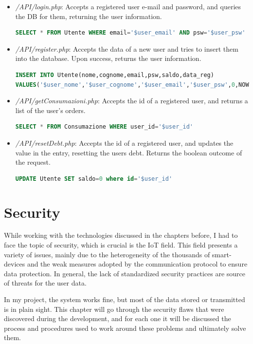 \documentclass[target=bach,aauheader=,style=]{thud}
\begin{document}
\begin{itemize}
	\item \emph{/API/login.php}: Accepts a registered user e-mail and password, and queries the DB for them, returning the user information.
\begin{lstlisting}[language=SQL,style=php_sql]
SELECT * FROM Utente WHERE email='$user_email' AND psw='$user_psw'
\end{lstlisting}
	\item \emph{/API/register.php}: Accepts the data of a new user and tries to  insert them into the database. Upon success, returns the user information.
\begin{lstlisting}[language=SQL,style=php_sql]
INSERT INTO Utente(nome,cognome,email,psw,saldo,data_reg)
VALUES('$user_nome','$user_cognome','$user_email','$user_psw',0,NOW())
\end{lstlisting}
	\item \emph{/API/getConsumazioni.php}: Accepts the id of a registered user, and returns a list of the user's orders.
\begin{lstlisting}[language=SQL,style=php_sql]
SELECT * FROM Consumazione WHERE user_id='$user_id'
\end{lstlisting}
	\item \emph{/API/resetDebt.php}:  Accepts the id of a registered user, and updates the value in the entry, resetting the users debt. Returns the boolean outcome of the request.
\begin{lstlisting}[language=SQL,style=php_sql]
UPDATE Utente SET saldo=0 where id='$user_id'
\end{lstlisting}

\end{itemize}


\chapter{Security}
While working with the technologies discussed in the chapters before, I had to face the topic of security, which is crucial is the IoT field. This field presents a variety of issues, mainly due to the heterogeneity of the thousands of smart-devices and the weak measures adopted by the communication protocol to ensure data protection. In general, the lack of standardized security practices are source of threats for the user data.

In my project, the system works fine, but most of the data stored or transmitted is in plain sight. This chapter will go through the security flaws that were discovered during the development, and for each one it will be discussed the process and procedures used to work around these problems and ultimately solve them.
\end{document}
